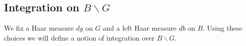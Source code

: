 \documentclass[reqno]{amsart} 
\begin{document}







\subsection{Integration on \texorpdfstring{$B \backslash G$}{B \ G}}\label{sec:integr-b-backsl}
We fix a Haar measure $d g$ on $G$ and a left Haar measure $d b$ on $B$.  Using these choices we will define a notion of integration over $B \backslash G$.
\end{document}
